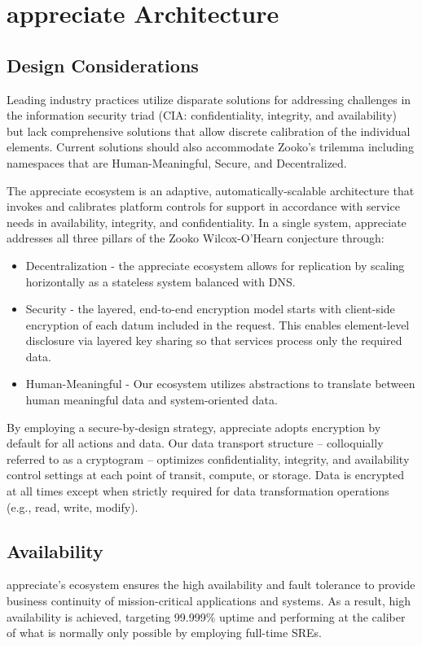 \documentclass[a4paper,onecolumn, 10.5pt]{article}
\begin{document}
\section{appreciate Architecture}

\subsection{Design Considerations}
Leading industry practices utilize disparate solutions for addressing challenges in the information security triad (CIA: confidentiality, integrity, and availability) but lack comprehensive solutions that allow discrete calibration of the individual elements. Current solutions should also accommodate Zooko’s trilemma\cite{zooko} including namespaces that are Human-Meaningful, Secure, and Decentralized.

The appreciate ecosystem is an adaptive, automatically-scalable architecture that invokes and calibrates platform controls for support in accordance with service needs in availability, integrity, and confidentiality. In a single system, appreciate addresses all three pillars of the Zooko Wilcox-O'Hearn conjecture through:


\begin{itemize}
	\item Decentralization - the appreciate ecosystem allows for replication by scaling horizontally as a stateless system balanced with DNS.
	\item Security - the layered, end-to-end encryption model starts with client-side encryption of each datum included in the request. This enables element-level disclosure via layered key sharing so that services process only the required data.
	\item Human-Meaningful - Our ecosystem utilizes abstractions to translate between human meaningful data and system-oriented data.	
\end{itemize}

By employing a secure-by-design strategy, appreciate adopts encryption by default for all actions and data. Our data transport structure -- colloquially referred to as a cryptogram -- optimizes confidentiality, integrity, and availability control settings at each point of transit, compute, or storage. Data is encrypted at all times except when strictly required for data transformation operations (e.g., read, write, modify).


\subsection{Availability}
appreciate’s ecosystem ensures the high availability and fault tolerance to provide business continuity of mission-critical applications and systems. As a result, high availability is achieved, targeting 99.999\% uptime and performing at the caliber of what is normally only possible by employing full-time SREs.
\end{document}
